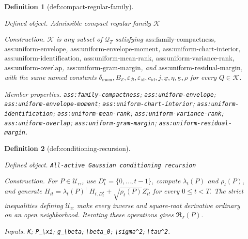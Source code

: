 \documentclass{article}
\newtheorem{definition}{Definition}
\begin{document}
\begin{definition}[def:compact-regular-family]\label{def:compact-regular-family}
\par\smallskip\noindent\emph{Defined object.} Admissible compact regular family \(\mathcal K\)
\par\smallskip\noindent\emph{Construction.} \(\mathcal K\) is any subset of \(\mathcal Q_T\) satisfying \(\text{ass:family-compactness}\), \(\text{ass:uniform-envelope}\), \(\text{ass:uniform-envelope-moment}\), \(\text{ass:uniform-chart-interior}\), \(\text{ass:uniform-identification}\), \(\text{ass:uniform-mean-rank}\), \(\text{ass:uniform-variance-rank}\), \(\text{ass:uniform-overlap}\), \(\text{ass:uniform-gram-margin}\), and \(\text{ass:uniform-residual-margin}\), with the same named constants \(\delta_{\mathrm{mom}},B_{\mathcal E},\varepsilon_{\mathcal B},\varepsilon_{\mathrm{id}},c_{\mathrm{id}},\underline j,\underline x,\eta,\underline\kappa,\underline\rho\) for every \(Q\in\mathcal K\).
\par\smallskip\noindent\emph{Member properties.} \texttt{ass:\allowbreak{}family-\allowbreak{}compactness}; \texttt{ass:\allowbreak{}uniform-\allowbreak{}envelope}; \texttt{ass:\allowbreak{}uniform-\allowbreak{}envelope-\allowbreak{}moment}; \texttt{ass:\allowbreak{}uniform-\allowbreak{}chart-\allowbreak{}interior}; \texttt{ass:\allowbreak{}uniform-\allowbreak{}identification}; \texttt{ass:\allowbreak{}uniform-\allowbreak{}mean-\allowbreak{}rank}; \texttt{ass:\allowbreak{}uniform-\allowbreak{}variance-\allowbreak{}rank}; \texttt{ass:\allowbreak{}uniform-\allowbreak{}overlap}; \texttt{ass:\allowbreak{}uniform-\allowbreak{}gram-\allowbreak{}margin}; \texttt{ass:\allowbreak{}uniform-\allowbreak{}residual-\allowbreak{}margin}.
\end{definition}

\begin{definition}[def:conditioning-recursion]\label{def:conditioning-recursion}
\par\smallskip\noindent\emph{Defined object.} \texttt{All-\allowbreak{}active Gaussian conditioning recursion}
\par\smallskip\noindent\emph{Construction.} For \(P\in\mathcal U_{\mathrm{rr}}\), use \(D_t^{\star}=\{0,\ldots,t-1\}\), compute \(\lambda_t(P)\) and \(\rho_t(P)\), and generate \(H_{it}=\lambda_t(P)^{\top}H_{i,D_t^{\star}}+\sqrt{\rho_t(P)}Z_{it}^{\circ}\) for every \(0\le t<T\). The strict inequalities defining \(\mathcal U_{\mathrm{rr}}\) make every inverse and square-root derivative ordinary on an open neighborhood. Iterating these operations gives \(\mathfrak R_T(P)\).
\par\smallskip\noindent\emph{Inputs.} \texttt{K}; \texttt{P\_\allowbreak{}\textbackslash{}\allowbreak{}xi}; \texttt{g\_\allowbreak{}\textbackslash{}\allowbreak{}beta}; \texttt{\textbackslash{}\allowbreak{}beta\_\allowbreak{}0}; \texttt{\textbackslash{}\allowbreak{}sigma\textasciicircum{}2}; \texttt{\textbackslash{}\allowbreak{}tau\textasciicircum{}2}.
\end{definition}
\end{document}
